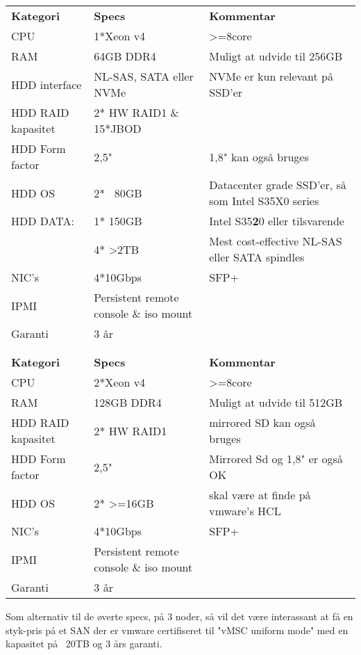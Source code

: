 



\def \overskrift    {Projekt XXX}         %
\def \CompanyName   {Tilbuds forespørgsel} %
\def \companyName   {\CompanyName}


\author{Heðin Ejdesgaard Møller}
\begin{center}
    \thispagestyle{SYNACKSALEFOOTER}
\end{center}
\vspace*{30mm}
\begin{tabular}{|l|l|l|}		\hline
	\rowcolor{black!75}
	\multicolumn{3}{|c|}{\head{3 nodes med følgende specs}}					\\ \hline
	\rowcolor{black!35}
	\textbf{Kategori}	& \textbf{Specs}	& \textbf{Kommentar}			\\ \hline
	CPU					& 1*Xeon v4			& >=8core	 					\\
	RAM					& 64GB DDR4			& Muligt at udvide til 256GB	\\ \hline
	HDD interface		& NL-SAS, SATA eller NVMe	& NVMe er kun relevant på SSD'er	\\
	HDD RAID kapasitet	& 2* HW RAID1 \& 15*JBOD	&						\\
	HDD Form factor		& 2,5"				& 1,8" kan også bruges			\\
	HDD OS				& 2* ~80GB			& Datacenter grade SSD'er, så som Intel S35X0 series 	\\
	HDD DATA:			& 1* 150GB			& Intel S35\textbf{2}0 eller tilsvarende				\\
						& 4* >2TB			& Mest cost-effective NL-SAS eller SATA spindles 		\\ \hline
	NIC's				& 4*10Gbps			& SFP+							\\
	IPMI				& Persistent remote console \& iso mount	&		\\
	Garanti				& 3 år				&								\\ \hline
	\multicolumn{3}{c}{}	\\
	\rowcolor{black!75}
	\multicolumn{3}{|c|}{\head{2 nodes med følgende specs}}					\\ \hline
	\rowcolor{black!35}
	\textbf{Kategori}	& \textbf{Specs}	& \textbf{Kommentar}			\\ \hline
	CPU					& 2*Xeon v4			& >=8core	 					\\
	RAM					& 128GB DDR4		& Muligt at udvide til 512GB 	\\ \hline
	HDD RAID kapasitet	& 2* HW RAID1		& mirrored SD kan også bruges	\\
	HDD Form factor		& 2,5" 				& Mirrored Sd og 1,8" er også OK\\
	HDD OS				& 2* >=16GB			& skal være at finde på vmware's HCL \\ \hline
	NIC's				& 4*10Gbps			& SFP+							\\
	IPMI				& Persistent remote console \& iso mount	&		\\
	Garanti				& 3 år				&								\\ \hline
\end{tabular}

\vspace{20mm}
\noindent
Som alternativ til de øverte specs, på 3 noder, så vil det være interassant at få en styk-pris på et SAN der er vmware certifiseret til "vMSC uniform mode" med en kapasitet på ~20TB og 3 års garanti.

